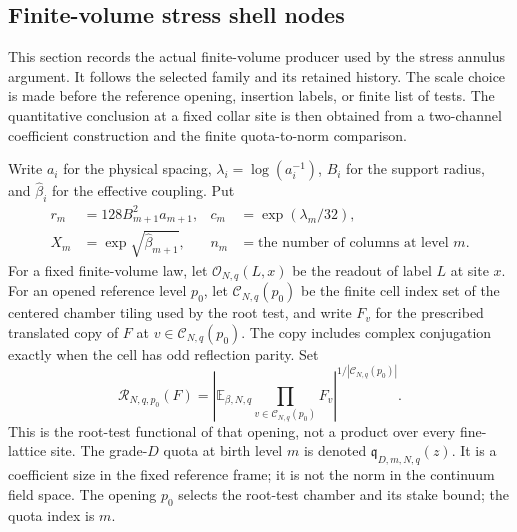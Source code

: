 \subsection{Finite-volume stress shell nodes}
\label{sec:ex-lattice-actual-stress-shell-nodes}

This section records the actual finite-volume producer used by the stress
annulus argument. It follows the selected family and its retained history.
The scale choice is made before the reference opening, insertion labels, or
finite list of tests. The quantitative conclusion at a fixed collar site is
then obtained from a two-channel coefficient construction and the finite
quota-to-norm comparison.

Write $a_i$ for the physical spacing, $\lambda_i=\log(a_i^{-1})$,
$B_i$ for the support radius, and $\widehat\beta_i$ for the effective
coupling. Put
\[
 \begin{aligned}
 r_m&=128 B_{m+1}^{2}a_{m+1}, & c_m&=\exp(\lambda_m/32),\\
 X_m&=\exp\sqrt{\widehat\beta_{m+1}}, & n_m&=\text{the number of columns at level }m.
 \end{aligned}
\]
For a fixed finite-volume law, let $\mathcal O_{N,q}(L,x)$ be the readout
of label $L$ at site $x$. For an opened reference level $p_0$, let
$\mathcal C_{N,q}(p_0)$ be the finite cell index set of the centered chamber
tiling used by the root test, and write $F_v$ for the prescribed translated
copy of $F$ at $v\in\mathcal C_{N,q}(p_0)$. The copy includes complex
conjugation exactly when the cell has odd reflection parity. Set
\begin{equation}\label{eq:ex-lattice-shell-root-functional}
 \mathcal R_{N,q,p_0}(F)=
 \left|\mathbb E_{\beta,N,q}
      \prod_{v\in\mathcal C_{N,q}(p_0)}F_v\right|^{1/|\mathcal C_{N,q}(p_0)|}.
\end{equation}
This is the root-test functional of that opening, not a product over every
fine-lattice site. The grade-$D$ quota at birth level $m$ is denoted
$\mathfrak q_{D,m,N,q}(z)$. It is a coefficient size in the fixed reference
frame; it is not the norm in the continuum field space. The opening $p_0$
selects the root-test chamber and its stake bound; the quota index is $m$.

